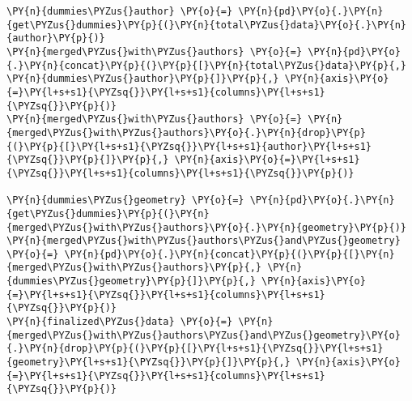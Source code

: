     \begin{tcolorbox}[breakable, size=fbox, boxrule=1pt, pad at break*=1mm,colback=cellbackground, colframe=cellborder]
\begin{Verbatim}[commandchars=\\\{\}]
\PY{n}{dummies\PYZus{}author} \PY{o}{=} \PY{n}{pd}\PY{o}{.}\PY{n}{get\PYZus{}dummies}\PY{p}{(}\PY{n}{total\PYZus{}data}\PY{o}{.}\PY{n}{author}\PY{p}{)}
\PY{n}{merged\PYZus{}with\PYZus{}authors} \PY{o}{=} \PY{n}{pd}\PY{o}{.}\PY{n}{concat}\PY{p}{(}\PY{p}{[}\PY{n}{total\PYZus{}data}\PY{p}{,} \PY{n}{dummies\PYZus{}author}\PY{p}{]}\PY{p}{,} \PY{n}{axis}\PY{o}{=}\PY{l+s+s1}{\PYZsq{}}\PY{l+s+s1}{columns}\PY{l+s+s1}{\PYZsq{}}\PY{p}{)}
\PY{n}{merged\PYZus{}with\PYZus{}authors} \PY{o}{=} \PY{n}{merged\PYZus{}with\PYZus{}authors}\PY{o}{.}\PY{n}{drop}\PY{p}{(}\PY{p}{[}\PY{l+s+s1}{\PYZsq{}}\PY{l+s+s1}{author}\PY{l+s+s1}{\PYZsq{}}\PY{p}{]}\PY{p}{,} \PY{n}{axis}\PY{o}{=}\PY{l+s+s1}{\PYZsq{}}\PY{l+s+s1}{columns}\PY{l+s+s1}{\PYZsq{}}\PY{p}{)}

\PY{n}{dummies\PYZus{}geometry} \PY{o}{=} \PY{n}{pd}\PY{o}{.}\PY{n}{get\PYZus{}dummies}\PY{p}{(}\PY{n}{merged\PYZus{}with\PYZus{}authors}\PY{o}{.}\PY{n}{geometry}\PY{p}{)}
\PY{n}{merged\PYZus{}with\PYZus{}authors\PYZus{}and\PYZus{}geometry} \PY{o}{=} \PY{n}{pd}\PY{o}{.}\PY{n}{concat}\PY{p}{(}\PY{p}{[}\PY{n}{merged\PYZus{}with\PYZus{}authors}\PY{p}{,} \PY{n}{dummies\PYZus{}geometry}\PY{p}{]}\PY{p}{,} \PY{n}{axis}\PY{o}{=}\PY{l+s+s1}{\PYZsq{}}\PY{l+s+s1}{columns}\PY{l+s+s1}{\PYZsq{}}\PY{p}{)}
\PY{n}{finalized\PYZus{}data} \PY{o}{=} \PY{n}{merged\PYZus{}with\PYZus{}authors\PYZus{}and\PYZus{}geometry}\PY{o}{.}\PY{n}{drop}\PY{p}{(}\PY{p}{[}\PY{l+s+s1}{\PYZsq{}}\PY{l+s+s1}{geometry}\PY{l+s+s1}{\PYZsq{}}\PY{p}{]}\PY{p}{,} \PY{n}{axis}\PY{o}{=}\PY{l+s+s1}{\PYZsq{}}\PY{l+s+s1}{columns}\PY{l+s+s1}{\PYZsq{}}\PY{p}{)}
\end{Verbatim}
\end{tcolorbox}


